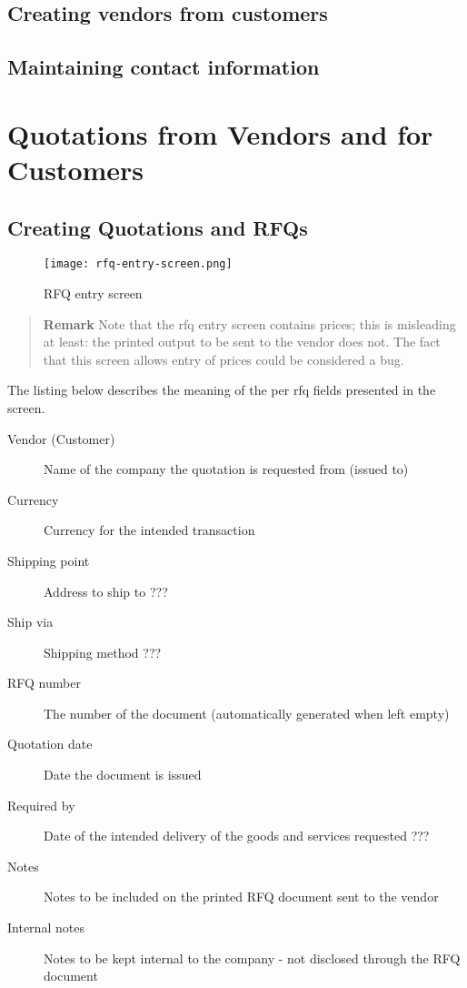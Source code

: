 \section{Creating vendors from customers}
\label{sec:VendorsFromCustomers}


\section{Maintaining contact information}


\chapter{Quotations from Vendors and for Customers}

\section{Creating Quotations and RFQs}
\label{sec:creating-quotations}


\begin{figure}[h]
\centering
\texttt{[image: rfq-entry-screen.png]}
\caption{RFQ entry screen}
\label{fig:rfq-entry-screen}
\end{figure}

\begin{quotation}
\textbf{Remark} Note that the \gls{rfq} entry screen contains prices; this is misleading
at least: the printed output to be sent to the vendor does not. The fact that this screen
allows entry of prices could be considered a bug.
\end{quotation}

The listing below describes the meaning of the per \gls{rfq} fields presented in the screen.

\begin{description}
\item [Vendor (Customer)] Name of the company the quotation is requested from (issued to)
\item [Currency] Currency for the intended transaction
\item [Shipping point] Address to ship to ??? %
\item [Ship via] Shipping method ???  %
\item [RFQ number] The number of the document (automatically generated when left empty)
\item [Quotation date] Date the document is issued
\item [Required by] Date of the intended delivery of the goods and services requested ??? %
\item [Notes] Notes to be included on the printed RFQ document sent to the vendor
\item [Internal notes] Notes to be kept internal to the company - not disclosed through the RFQ document
\end{description}

